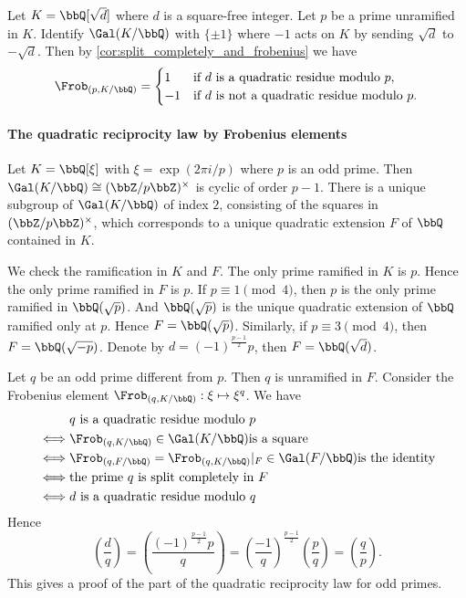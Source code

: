    \begin{example}
        Let \(K = \bbQ[\sqrt{d}]\) where \(d\) is a square-free integer.
        Let \(p\) be a prime unramified in \(K\).
        Identify \(\Gal(K/\bbQ)\) with \(\{\pm 1\}\) where \(-1\) acts on \(K\) by sending \(\sqrt{d}\) to \(-\sqrt{d}\).
        Then by \cref{cor:split_completely_and_frobenius} we have
        \[ \Frob_{(p, K/\bbQ)} = \begin{cases}
            1 & \text{if } d \text{ is a quadratic residue modulo } p, \\
            -1 & \text{if } d \text{ is not a quadratic residue modulo } p.
        \end{cases} \]
    \end{example}

    \paragraph{The quadratic reciprocity law by Frobenius elements}
    Let \(K = \bbQ[\xi]\) with \(\xi = \exp({2\pi i/p})\) where \(p\) is an odd prime.
    Then \(\Gal(K/\bbQ) \cong (\bbZ/p\bbZ)^\times\) is cyclic of order \(p-1\).
    There is a unique subgroup of \(\Gal(K/\bbQ)\) of index \(2\), 
    consisting of the squares in \((\bbZ/p\bbZ)^\times\),
    which corresponds to a unique quadratic extension \(F\) of \(\bbQ\) contained in \(K\).

    We check the ramification in \(K\) and \(F\).
    The only prime ramified in \(K\) is \(p\).
    Hence the only prime ramified in \(F\) is \(p\).
    If \(p \equiv 1 \pmod{4}\), then \(p\) is the only prime ramified in \(\bbQ(\sqrt{p})\).
    And \(\bbQ(\sqrt{p})\) is the unique quadratic extension of \(\bbQ\) ramified only at \(p\).
    Hence \(F = \bbQ(\sqrt{p})\).
    Similarly, if \(p \equiv 3 \pmod{4}\), then \(F = \bbQ(\sqrt{-p})\).
    Denote by \(d = (-1)^{\frac{p-1}{2}}p\), then \(F = \bbQ(\sqrt{d})\).

    Let \(q\) be an odd prime different from \(p\).
    Then \(q\) is unramified in \(F\).
    Consider the Frobenius element \(\Frob_{(q, K/\bbQ)}: \xi \mapsto \xi^q\).
    We have 
    \begin{align*}
            & q \text{ is a quadratic residue modulo } p \\
        \iff & \Frob_{(q, K/\bbQ)} \in \Gal(K/\bbQ) \text{is a square} \\
        \iff & \Frob_{(q, F/\bbQ)} = \Frob_{(q, K/\bbQ)}|_F \in \Gal(F/\bbQ) \text{is the identity} \\
        \iff & \text{the prime } q \text{ is split completely in } F \\
        \iff & d \text{ is a quadratic residue modulo } q
    \end{align*}
    Hence
    \[ \left(\frac{d}{q}\right) = \left(\frac{(-1)^{\frac{p-1}{2}}p}{q}\right) = \left(\frac{-1}{q}\right)^{\frac{p-1}{2}} \left(\frac{p}{q}\right) = \left(\frac{q}{p}\right). \]
    This gives a proof of the part of the quadratic reciprocity law for odd primes.

